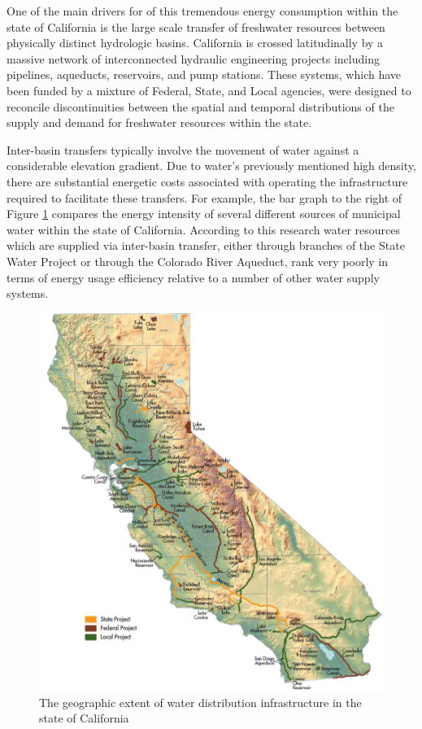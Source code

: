One of the main drivers for of this tremendous energy consumption within the state of California is the large scale transfer of freshwater resources between physically distinct hydrologic basins. California is crossed latitudinally by a massive network of interconnected hydraulic engineering projects including pipelines, aqueducts, reservoirs, and pump stations. These systems, which have been funded by a mixture of Federal, State, and Local agencies, were designed to reconcile discontinuities between the spatial and temporal distributions of the supply and demand for freshwater resources within the state.
    
Inter-basin transfers typically involve the movement of water against a considerable elevation gradient. Due to water's previously mentioned high density, there are substantial energetic costs associated with operating the infrastructure required to facilitate these transfers. For example, the bar graph to the right of Figure \ref{fig:infrastructure-energy-intensity} compares the energy intensity of several different sources of municipal water within the state of California. According to this research water resources which are supplied via inter-basin transfer, either through branches of the State Water Project or through the Colorado River Aqueduct, rank very poorly in terms of energy usage efficiency relative to a number of other water supply systems.
    
       \begin{figure}[The geographic extent of water distribution infrastructure in the state California]
       \centering
       \includegraphics[width=5.5in]{figures/infrastructure.png}
       \caption[Characteristics of Water Distribution Infrastructure]{The geographic extent of water distribution infrastructure in the state of California}
       \label{fig:infrastructure-energy-intensity}
     \end{figure}
    
